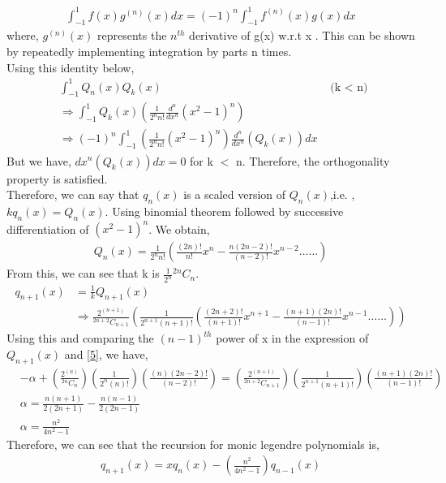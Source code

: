 \documentclass[letterpaper]{exam}
\begin{document}
\begin{questions}
\begin{parts}
\begin{solution}
\begin{align}\label{5}
\int_{-1}^{1} f(x)g^{(n)}(x) dx = (-1)^n \int_{-1}^{1} f^{(n)}(x)g(x)dx
\end{align}
where, $g^{(n)}(x)$ represents the $n^{th}$ derivative of g(x) w.r.t x . This can be shown by repeatedly implementing integration by parts n times.\\
Using this identity below,
\begin{align*}
    & \int_{-1}^{1} Q_{n}(x)Q_{k}(x) & \mbox{ (k $<$ n) }\\
    & \Rightarrow
    \int_{-1}^{1} Q_{k}(x)\left(\frac{1}{2^n n!}\frac{d^n }{dx^n}\left(x^2-1\right)^n\right)\\
    & \Rightarrow 
    (-1)^n \int_{-1}^{1}\left(\frac{1}{2^n n!}\left(x^2-1\right)^n\right)\frac{d^n }{dx^n}\left(Q_{k}(x)\right)dx
\end{align*}
  But we have, ${dx^n}\left(Q_{k}(x)\right)dx = 0$ for k $<$ n. Therefore, the orthogonality property is satisfied.\\
  Therefore, we can say that $q_n(x)$ is a scaled version of $Q_n(x)$,i.e. ,$k q_n(x) =  Q_n(x)$.
  Using binomial theorem followed by successive differentiation of $(x^2-1)^n$.
  We obtain, 
  \begin{align*}
      Q_{n}(x) = \frac{1}{2^n n!} \left(\frac{(2n)!}{n!}x^n - \frac{n(2n-2)!}{(n-2)!}x^{n-2} \ldots \ldots \right)
  \end{align*}
  From this, we can see that k is $\frac{1}{2^n}{}^{2n}C_{n}$.\\
  \begin{align*}
      q_{n+1}(x) &= \frac{1}{k}Q_{n+1}(x)\\
      &\Rightarrow 
      \frac{2^(n+1)}{{}^{2n+2}C_{n+1}}\left(\frac{1}{2^{n+1} (n+1)!} \left(\frac{(2n+2)!}{(n+1)!}x^{n+1} - \frac{(n+1)(2n)!}{(n-1)!}x^{n-1} \ldots \ldots \right) \right)
  \end{align*}
  Using this and comparing the $(n-1)^{th}$ power of x in the expression of $Q_{n+1}(x)$ and \ref{5}, we have,
  \begin{align}
      & -\alpha +\left(\frac{2^(n)}{{}^{2n}C_{n}}\right)\left(\frac{1}{2^{n} (n)!}\right) \left(\frac{(n)(2n-2)!}{(n-2)!}\right)  =\left(\frac{2^(n+1)}{{}^{2n+2}C_{n+1}}\right)\left(\frac{1}{2^{n+1} (n+1)!}\right) \left(\frac{(n+1)(2n)!}{(n-1)!}\right)\\
      &\alpha = \frac{n(n+1)}{2(2n+1)} - \frac{n(n-1)}{2(2n-1)}\\
      &\alpha = \frac{n^2}{4n^2 - 1}
  \end{align}
  Therefore, we can see that the recursion for monic legendre polynomials is,
  \begin{align}
    q_{n+1}(x) = xq_{n}(x) - \left(\frac{n^2}{4n^2-1}\right)q_{n-1}(x)  
  \end{align}
\end{solution}

\end{parts}
\end{questions}
\end{document}

